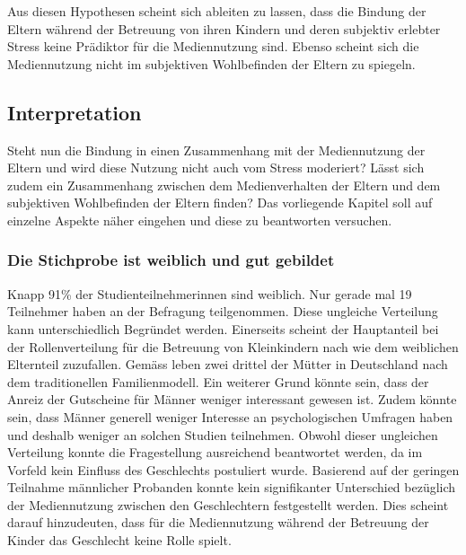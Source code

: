 Aus diesen Hypothesen scheint sich ableiten zu lassen, dass die Bindung der Eltern während der Betreuung von ihren Kindern und deren subjektiv erlebter Stress keine Prädiktor für die Mediennutzung sind. Ebenso scheint sich die Mediennutzung nicht im subjektiven Wohlbefinden der Eltern zu spiegeln.

\subsection{Interpretation} \label{sec:Interpretation}
Steht nun die Bindung in einen Zusammenhang mit der Mediennutzung der Eltern und wird diese Nutzung nicht auch vom Stress moderiert? Lässt sich zudem ein Zusammenhang zwischen dem Medienverhalten der Eltern und dem subjektiven Wohlbefinden der Eltern finden? Das vorliegende Kapitel soll auf einzelne Aspekte näher eingehen und diese zu beantworten versuchen.

\subsubsection{Die Stichprobe ist weiblich und gut gebildet}
Knapp 91\% der Studienteilnehmerinnen sind weiblich. Nur gerade mal 19 Teilnehmer haben an der Befragung teilgenommen. Diese ungleiche Verteilung kann unterschiedlich Begründet werden. Einerseits scheint der Hauptanteil bei der Rollenverteilung für die Betreuung von Kleinkindern nach wie dem weiblichen Elternteil zuzufallen. Gemäss  leben zwei drittel der Mütter in Deutschland nach dem traditionellen Familienmodell. Ein weiterer Grund könnte sein, dass der Anreiz der Gutscheine für Männer weniger interessant gewesen ist. Zudem könnte sein, dass Männer generell weniger Interesse an psychologischen Umfragen haben und deshalb weniger an solchen Studien teilnehmen. Obwohl dieser ungleichen Verteilung konnte die Fragestellung ausreichend beantwortet werden, da im Vorfeld kein Einfluss des Geschlechts postuliert wurde. Basierend auf der geringen Teilnahme männlicher Probanden konnte kein signifikanter Unterschied bezüglich der Mediennutzung zwischen den Geschlechtern festgestellt werden. Dies scheint darauf hinzudeuten, dass für die Mediennutzung während der Betreuung der Kinder das Geschlecht keine Rolle spielt.


